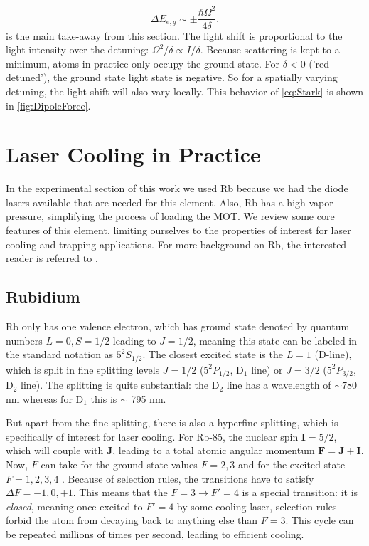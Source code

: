 \begin{equation}\label{eq:Stark}
	\Delta E_{e,g} \sim \pm \frac{\hbar \Omega^2}{4 \delta}.
\end{equation}
 is the main take-away from this section.
The light shift is proportional to the light intensity over the detuning: $\Omega^2 / \delta \propto I / \delta$.
Because scattering is kept to a minimum, atoms in practice only occupy the ground state.
For $\delta <0$ ('red detuned'), the ground state light state is negative. 
So for a spatially varying detuning, the light shift will also vary locally.
This behavior of \cref{eq:Stark} is shown in \cref{fig:DipoleForce}. 


\section{Laser Cooling in Practice}\label{sec:PracticeRb}

In the experimental section of this work we used \ac{Rb} because we had the diode lasers available that are needed for this element.
Also, Rb has a high vapor pressure, simplifying the process of loading the \ac{MOT}.
We review some core features of this element, limiting ourselves to the properties of interest for laser cooling and trapping applications.
For more background on Rb, the interested reader is referred to \cite{Steck2008}.


\subsection{Rubidium}

Rb only has one valence electron, which has ground state denoted by quantum numbers $L=0, S=1/2$ leading to $J=1/2$, meaning this state can be labeled in the standard notation as $5^2S_{1/2}$.
The closest excited state is the $L=1$ (D-line), which is split in fine splitting levels $J=1/2$ ($5^2P_{1/2}$, D$_1$ line) or $J=3/2$ ($5^2P_{3/2}$, D$_2$ line).
The splitting is quite substantial: the D$_2$ line has a wavelength of $\sim780$ nm whereas for D$_1$ this is $\sim$ 795 nm.

But apart from the fine splitting, there is also a hyperfine splitting, which is specifically of interest for laser cooling.
For Rb-85, the nuclear spin $\mathbf{I}=5/2$, which will couple with $\mathbf{J}$, leading to a total atomic angular momentum $\mathbf{F} = \mathbf{J} + \mathbf{I}$.
Now, $F$ can take for the ground state values $F=2,3$ and for the excited state $F=1,2,3,4$ \cite{Steck2008}. 
Because of selection rules, the transitions have to satisfy $\Delta F = -1, 0, +1$. 
This means that the $F = 3 \rightarrow F'=4$ is a special transition: it is \textit{closed}, meaning once excited to $F'=4$ by some cooling laser, selection rules forbid the atom from decaying back to anything else than $F=3$. 
This cycle can be repeated millions of times per second, leading to efficient cooling.


